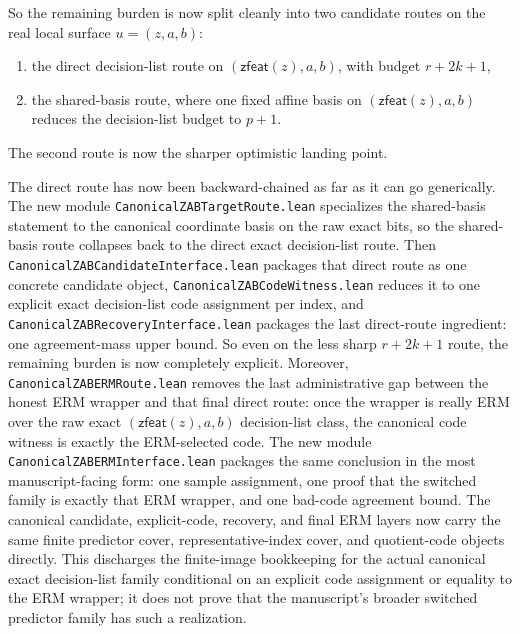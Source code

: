 \documentclass[11pt]{article}
\theoremstyle{remark}
\begin{document}
So the remaining burden is now split cleanly into two candidate routes on the
real local surface \(u=(z,a,b)\):
\begin{enumerate}[leftmargin=1.5em]
  \item the direct decision-list route on \((\mathsf{zfeat}(z),a,b)\), with budget \(r+2k+1\),
  \item the shared-basis route, where one fixed affine basis on \((\mathsf{zfeat}(z),a,b)\) reduces the decision-list budget to \(p+1\).
\end{enumerate}
The second route is now the sharper optimistic landing point.

The direct route has now been backward-chained as far as it can go generically.
The new module \texttt{CanonicalZABTargetRoute.lean} specializes the
shared-basis statement to the canonical coordinate basis on the raw exact bits,
so the shared-basis route collapses back to the direct exact decision-list
route.  Then \texttt{CanonicalZABCandidateInterface.lean} packages that direct
route as one concrete candidate object, \texttt{CanonicalZABCodeWitness.lean}
reduces it to one explicit exact decision-list code assignment per index, and
\texttt{CanonicalZABRecoveryInterface.lean} packages the last direct-route
ingredient: one agreement-mass upper bound.  So even on the less sharp
\(r+2k+1\) route, the remaining burden is now completely explicit.  Moreover,
\texttt{CanonicalZABERMRoute.lean} removes the last administrative gap between
the honest ERM wrapper and that final direct route: once the wrapper is really
ERM over the raw exact \((\mathsf{zfeat}(z),a,b)\) decision-list class, the
canonical code witness is exactly the ERM-selected code.  The new module
\texttt{CanonicalZABERMInterface.lean} packages the same conclusion in the most
manuscript-facing form: one sample assignment, one proof that the switched
family is exactly that ERM wrapper, and one bad-code agreement bound.  The
canonical candidate, explicit-code, recovery, and final ERM layers now carry
the same finite predictor cover, representative-index cover, and quotient-code
objects directly.  This discharges the finite-image bookkeeping for the actual
canonical exact decision-list family conditional on an explicit code assignment
or equality to the ERM wrapper; it does not prove that the manuscript's broader
switched predictor family has such a realization.
\end{document}
